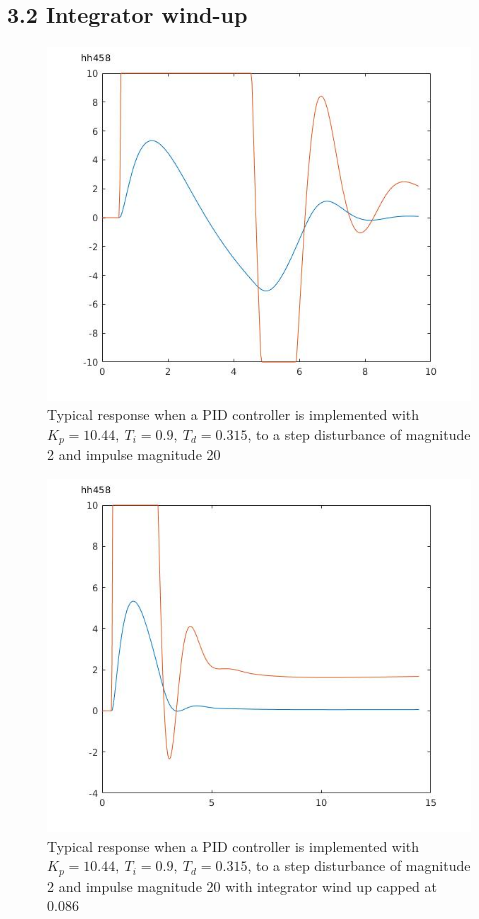\documentclass[twoside,twocolumn]{article}
\begin{document}
\subsection{3.2 Integrator wind-up}
\begin{figure}[h]
  \centering
    \includegraphics[width=\linewidth]{3-2_first_go}
  \caption{Typical response when a PID controller is implemented with $K_p = 10.44,\:T_i=0.9,\:T_d=0.315$, to a step disturbance of magnitude 2 and impulse magnitude 20}
  \label{fig:3-2first}
\end{figure}

\begin{figure}[h]
  \centering
    \includegraphics[width=\linewidth]{3-2_0-086}
  \caption{Typical response when a PID controller is implemented with $K_p = 10.44,\:T_i=0.9,\:T_d=0.315$, to a step disturbance of magnitude 2 and impulse magnitude 20 with integrator wind up capped at 0.086}
  \label{fig:3-20-086}
\end{figure}
\end{document}
